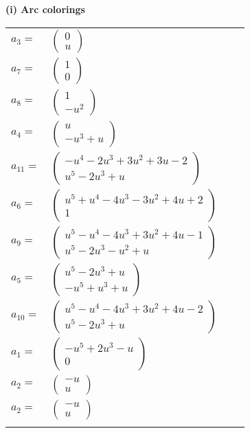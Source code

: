 \documentclass[1p]{elsarticle_modified}
\theoremstyle{definition}
\begin{document}
\flushleft \textbf{(i) Arc colorings}\\
\begin{tabular}{m{7pt} m{180pt} m{7pt} m{180pt} }
\flushright $a_{3}=$&$\begin{pmatrix}0\\u\end{pmatrix}$ \\
\flushright $a_{7}=$&$\begin{pmatrix}1\\0\end{pmatrix}$ \\
\flushright $a_{8}=$&$\begin{pmatrix}1\\- u^2\end{pmatrix}$ \\
\flushright $a_{4}=$&$\begin{pmatrix}u\\- u^3+u\end{pmatrix}$ \\
\flushright $a_{11}=$&$\begin{pmatrix}- u^4-2 u^3+3 u^2+3 u-2\\u^5-2 u^3+u\end{pmatrix}$ \\
\flushright $a_{6}=$&$\begin{pmatrix}u^5+u^4-4 u^3-3 u^2+4 u+2\\1\end{pmatrix}$ \\
\flushright $a_{9}=$&$\begin{pmatrix}u^5- u^4-4 u^3+3 u^2+4 u-1\\u^5-2 u^3- u^2+u\end{pmatrix}$ \\
\flushright $a_{5}=$&$\begin{pmatrix}u^5-2 u^3+u\\- u^5+u^3+u\end{pmatrix}$ \\
\flushright $a_{10}=$&$\begin{pmatrix}u^5- u^4-4 u^3+3 u^2+4 u-2\\u^5-2 u^3+u\end{pmatrix}$ \\
\flushright $a_{1}=$&$\begin{pmatrix}- u^5+2 u^3- u\\0\end{pmatrix}$ \\
\flushright $a_{2}=$&$\begin{pmatrix}- u\\u\end{pmatrix}$\\ \flushright $a_{2}=$&$\begin{pmatrix}- u\\u\end{pmatrix}$\\&\end{tabular}
\end{document}
